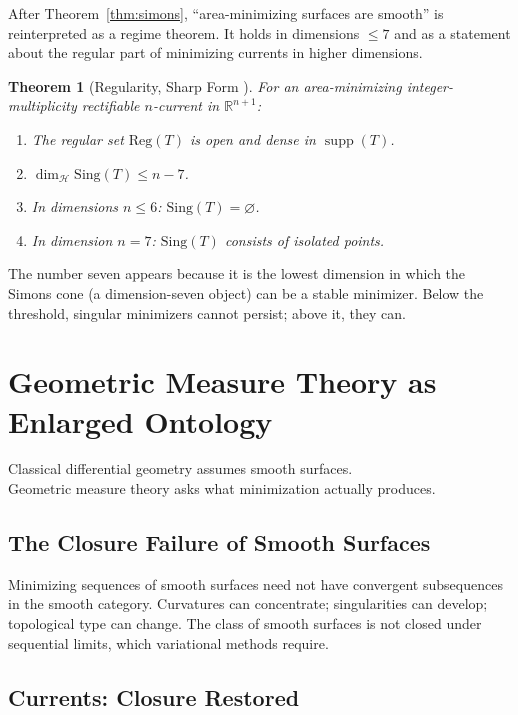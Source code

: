 \documentclass[12pt,oneside]{book}
\theoremstyle{plain}
\newtheorem{theorem}{Theorem}[chapter]
\theoremstyle{definition}
\theoremstyle{remark}
\newcommand{\supp}{\operatorname{supp}}
\newcommand{\Real}{\mathbb{R}}
\begin{document}
After Theorem~\ref{thm:simons}, ``area-minimizing surfaces are smooth'' is
reinterpreted as a regime theorem. It holds in dimensions $\leq 7$ and as
a statement about the regular part of minimizing currents in higher dimensions.

\begin{theorem}[Regularity, Sharp Form \cite{federer1969,simon1983}]
For an area-minimizing integer-multiplicity rectifiable $n$-current in
$\Real^{n+1}$:
\begin{enumerate}[label=(\arabic*)]
\item The regular set $\mathrm{Reg}(T)$ is open and dense in $\supp(T)$.
\item $\dim_{\mathcal{H}}\mathrm{Sing}(T) \leq n - 7$.
\item In dimensions $n \leq 6$: $\mathrm{Sing}(T) = \varnothing$.
\item In dimension $n = 7$: $\mathrm{Sing}(T)$ consists of isolated points.
\end{enumerate}
\end{theorem}

The number seven appears because it is the lowest dimension in which the
Simons cone (a dimension-seven object) can be a stable minimizer. Below the
threshold, singular minimizers cannot persist; above it, they can.

\chapter{Geometric Measure Theory as Enlarged Ontology}

\epigraph{Classical differential geometry assumes smooth surfaces.\\
Geometric measure theory asks what minimization actually produces.}{}

\section{The Closure Failure of Smooth Surfaces}

Minimizing sequences of smooth surfaces need not have convergent subsequences
in the smooth category. Curvatures can concentrate; singularities can develop;
topological type can change. The class of smooth surfaces is not closed under
sequential limits, which variational methods require.

\section{Currents: Closure Restored}
\end{document}
